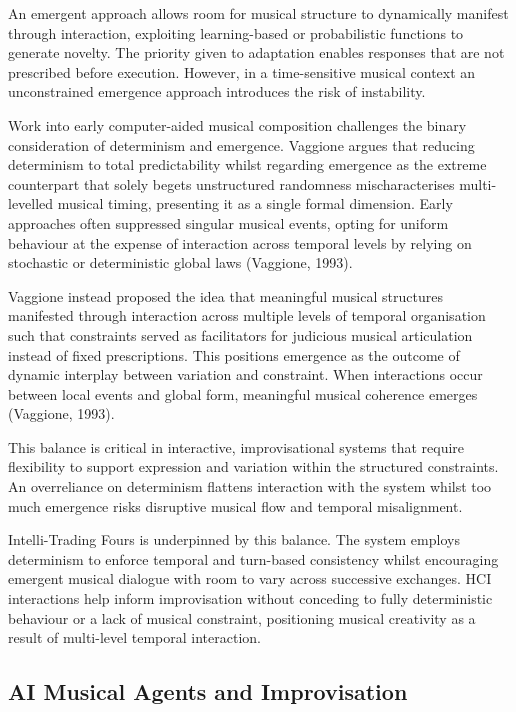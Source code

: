 \documentclass[11pt,a4paper]{article}
\begin{document}
An emergent approach allows room for musical structure to dynamically manifest through interaction, exploiting learning-based or probabilistic functions to generate novelty. The priority given to adaptation enables responses that are not prescribed before execution. However, in a time-sensitive musical context an unconstrained emergence approach introduces the risk of instability. 

Work into early computer-aided musical composition challenges the binary consideration of determinism and emergence. Vaggione argues that reducing determinism to total predictability whilst regarding emergence as the extreme counterpart that solely begets unstructured randomness mischaracterises multi-levelled musical timing, presenting it as a single formal dimension. Early approaches often suppressed singular musical events, opting for uniform behaviour at the expense of interaction across temporal levels by relying on stochastic or deterministic global laws (Vaggione, 1993). 

Vaggione instead proposed the idea that meaningful musical structures manifested through interaction across multiple levels of temporal organisation such that constraints served as facilitators for judicious musical articulation instead of fixed prescriptions. This positions emergence as the outcome of dynamic interplay between variation and constraint. When interactions occur between local events and global form, meaningful musical coherence emerges (Vaggione, 1993). 

This balance is critical in interactive, improvisational systems that require flexibility to support expression and variation within the structured constraints. An overreliance on determinism flattens interaction with the system whilst too much emergence risks disruptive musical flow and temporal misalignment.

Intelli-Trading Fours is underpinned by this balance. The system employs determinism to enforce temporal and turn-based consistency whilst encouraging emergent musical dialogue with room to vary across successive exchanges. HCI interactions help  inform improvisation without conceding to fully deterministic behaviour or a lack of musical constraint, positioning musical creativity as a result of multi-level temporal interaction.

\subsection{AI Musical Agents and Improvisation}
\end{document}
